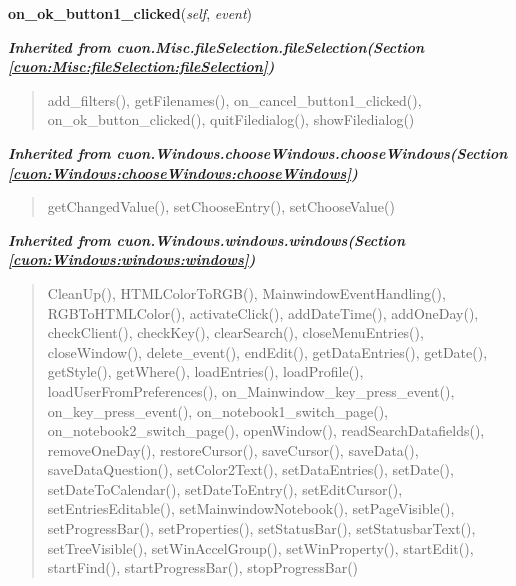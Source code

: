     \vspace{0.5ex}

\hspace{.8\funcindent}\begin{boxedminipage}{\funcwidth}

    \raggedright \textbf{on\_ok\_button1\_clicked}(\textit{self}, \textit{event})

\setlength{\parskip}{2ex}
\setlength{\parskip}{1ex}
    \end{boxedminipage}


\large{\textbf{\textit{Inherited from cuon.Misc.fileSelection.fileSelection\textit{(Section \ref{cuon:Misc:fileSelection:fileSelection})}}}}

\begin{quote}
add\_filters(), getFilenames(), on\_cancel\_button1\_clicked(), on\_ok\_button\_clicked(), quitFiledialog(), showFiledialog()
\end{quote}

\large{\textbf{\textit{Inherited from cuon.Windows.chooseWindows.chooseWindows\textit{(Section \ref{cuon:Windows:chooseWindows:chooseWindows})}}}}

\begin{quote}
getChangedValue(), setChooseEntry(), setChooseValue()
\end{quote}

\large{\textbf{\textit{Inherited from cuon.Windows.windows.windows\textit{(Section \ref{cuon:Windows:windows:windows})}}}}

\begin{quote}
CleanUp(), HTMLColorToRGB(), MainwindowEventHandling(), RGBToHTMLColor(), activateClick(), addDateTime(), addOneDay(), checkClient(), checkKey(), clearSearch(), closeMenuEntries(), closeWindow(), delete\_event(), endEdit(), getDataEntries(), getDate(), getStyle(), getWhere(), loadEntries(), loadProfile(), loadUserFromPreferences(), on\_Mainwindow\_key\_press\_event(), on\_key\_press\_event(), on\_notebook1\_switch\_page(), on\_notebook2\_switch\_page(), openWindow(), readSearchDatafields(), removeOneDay(), restoreCursor(), saveCursor(), saveData(), saveDataQuestion(), setColor2Text(), setDataEntries(), setDate(), setDateToCalendar(), setDateToEntry(), setEditCursor(), setEntriesEditable(), setMainwindowNotebook(), setPageVisible(), setProgressBar(), setProperties(), setStatusBar(), setStatusbarText(), setTreeVisible(), setWinAccelGroup(), setWinProperty(), startEdit(), startFind(), startProgressBar(), stopProgressBar()
\end{quote}

